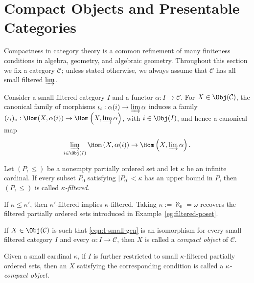 \section{Compact Objects and Presentable Categories}\label{sec:cpt-objects}
Compactness in category theory is a common refinement of many finiteness conditions in algebra, geometry, and algebraic geometry. Throughout this section we fix a category $\mathcal{C}$; unless stated otherwise, we always assume that $\mathcal{C}$ has all small filtered $\varinjlim$.

Consider a small filtered category $I$ and a functor $\alpha:I\to\mathcal{C}$. For $X\in\Obj(\mathcal{C})$, the canonical family of morphisms $\iota_i:\alpha(i)\to\varinjlim\alpha$ induces a family $(\iota_i)_*:\Hom(X,\alpha(i))\to\Hom\left(X,\varinjlim\alpha\right)$, with $i\in\Obj(I)$, and hence a canonical map
\begin{equation}\label{eqn:I-small-gen}
	\varinjlim_{i \in \Obj(I)} \Hom\left( X, \alpha(i) \right) \to \Hom\left( X, \varinjlim \alpha \right).
\end{equation}

\begin{definition}\label{def:kappa-filtered}
	Let $(P,\leq)$ be a nonempty partially ordered set and let $\kappa$ be an infinite cardinal. If every subset $P_0$ satisfying $|P_0|<\kappa$ has an upper bound in $P$, then $(P,\leq)$ is called \emph{$\kappa$-filtered}.
\end{definition}

If $\kappa\leq\kappa'$, then $\kappa'$-filtered implies $\kappa$-filtered. Taking $\kappa:=\aleph_0=\omega$ recovers the filtered partially ordered sets introduced in Example~\ref{eg:filtered-poset}.

\begin{definition}\label{def:cpt-objects}
	If $X\in\Obj(\mathcal{C})$ is such that \eqref{eqn:I-small-gen} is an isomorphism for every small filtered category $I$ and every $\alpha:I\to\mathcal{C}$, then $X$ is called a \emph{compact object} of $\mathcal{C}$.

	Given a small cardinal $\kappa$, if $I$ is further restricted to small $\kappa$-filtered partially ordered sets, then an $X$ satisfying the corresponding condition is called a \emph{$\kappa$-compact object}.
\end{definition}

